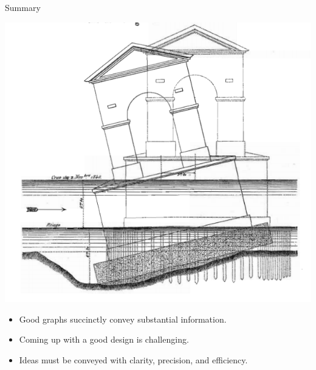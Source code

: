 \documentclass[
  ignorenonframetext,
]{beamer}
\begin{document}
\begin{frame}{Summary}
\protect\hypertarget{summary}{}
\begin{minipage}{0.45\textwidth}
\centering
\includegraphics[width=\textwidth]{excellence_figs/fig_35.png}
\end{minipage}
\hfill
\begin{minipage}{0.5\textwidth}
\footnotesize
\begin{itemize}
  \item Good graphs succinctly convey substantial information.
  \item Coming up with a good design is challenging.
  \item Ideas must be conveyed with clarity, precision, and efficiency.
\end{itemize}
\end{minipage}
\end{frame}
\end{document}
